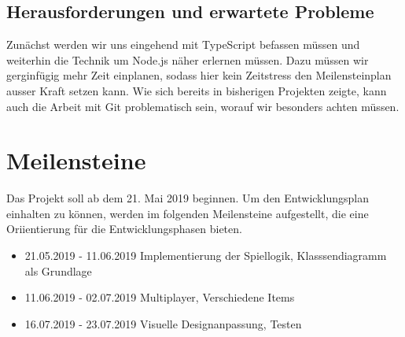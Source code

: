 \documentclass[10pt, a4paper]{report}
\begin{document}
	\subsection{Herausforderungen und erwartete Probleme}
	Zunächst werden wir uns eingehend mit TypeScript befassen müssen und weiterhin die Technik um Node.js näher erlernen müssen. Dazu müssen wir gerginfügig mehr Zeit einplanen, sodass hier kein Zeitstress den Meilensteinplan ausser Kraft setzen kann. Wie sich bereits in bisherigen Projekten zeigte, kann auch die Arbeit mit Git problematisch sein, worauf wir besonders achten müssen.
	\section{Meilensteine}
	Das Projekt soll ab dem 21. Mai 2019 beginnen. Um den Entwicklungsplan einhalten zu können, werden im folgenden Meilensteine aufgestellt, die eine Oriientierung für
	die Entwicklungsphasen bieten. 
	\begin{itemize}
		\item 21.05.2019 - 11.06.2019 Implementierung der Spiellogik, Klasssendiagramm als Grundlage
		\item 11.06.2019 - 02.07.2019 Multiplayer, Verschiedene Items
		\item 16.07.2019 - 23.07.2019 Visuelle Designanpassung, Testen
	\end{itemize}
\end{document}
